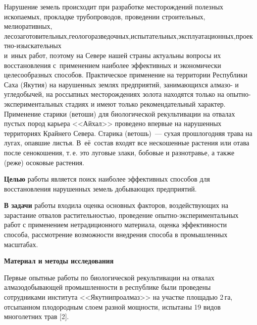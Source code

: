 
 



\makeProcTitleNewLine

Нарушение земель происходит при разработке месторождений полезных ископаемых, прокладке трубопроводов, проведении строительных, мелиоративных, лесозаготовительных,\;\;геологоразведочных,\;\;испытательных,\;\;эксплуатационных,\;\;проектно-изыскательных\\и~иных работ, поэтому на Севере нашей страны актуальны вопросы их восстановления с~применением наиболее эффективных и экономически целесообразных способов. Практическое применение на территории Республики Саха (Якутия) на нарушенных землях предприятий, занимающихся алмазо- и угледобычей, на россыпных месторождениях золота находятся только на опытно-экспериментальных стадиях и имеют только рекомендательный характер.  Применение старики (ветоши) для биологической рекультивации на отвалах пустых пород карьера <<Айхал>> проведено впервые на нарушенных территориях Крайнего Севера. Старика (ветошь)~--- сухая прошлогодняя трава на лугах, опавшие листья. В~её~состав входят все нескошенные растения или отава после сенокошения, т.\,е. это луговые злаки, бобовые и разнотравье, а также (реже) осоковые растения.

\textbf{Целью} работы является поиск наиболее эффективных способов для восстановления нарушенных земель добывающих предприятий.

\textbf{В задачи} работы входила оценка основных факторов, воздействующих на зарастание отвалов растительностью, проведение опытно-экс\-пе\-ри\-мен\-таль\-ных работ с применением нетрадиционного материала, оценка эффективности способа, рассмотрение возможности внедрения способа в промышленных масштабах.

\textbf{Материал и методы исследования}

Первые опытные работы по биологической рекультивации на отвалах алмазодобывающей промышленности в республике были проведены сотрудниками института <<Якутнипроалмаз>> на участке площадью 2\,га, отсыпанном плодородным слоем разной мощности, испытаны 19 видов многолетних трав [2].

